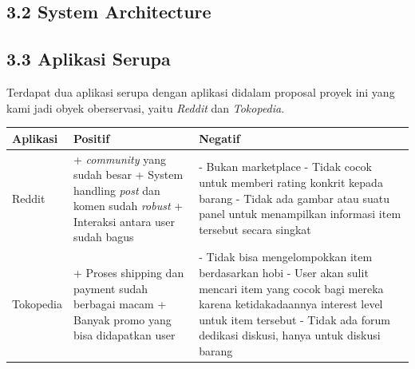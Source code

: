 \documentclass[a4paper]{article}
\begin{document}
\subsection*{3.2 System Architecture}

\newpage
\subsection*{3.3 Aplikasi Serupa}

Terdapat dua aplikasi serupa dengan aplikasi didalam proposal proyek ini yang kami jadi obyek oberservasi, yaitu \textit{Reddit} dan \textit{Tokopedia}.

\begin{table}[h] 
    \begin{tabular}{|m{2cm}|p{5cm}|p{5cm}|}
        \hline
        Aplikasi & Positif & Negatif \\ 
        \hline
        Reddit 
        &   + \textit{community} yang sudah besar \newline 
            + System handling \textit{post} dan komen sudah \textit{robust} \newline 
            + Interaksi antara user sudah bagus 
        &   - Bukan marketplace \newline 
            - Tidak cocok untuk memberi rating konkrit kepada barang \newline 
            - Tidak ada gambar atau suatu panel untuk menampilkan informasi item tersebut secara singkat \\ 
        \hline
        Tokopedia
        &   + Proses shipping dan payment sudah berbagai macam \newline  
            + Banyak promo yang bisa didapatkan user  
        &   - Tidak bisa mengelompokkan item berdasarkan hobi \newline 
            - User akan sulit mencari item yang cocok bagi mereka karena ketidakadaannya interest level untuk item tersebut \newline 
            - Tidak ada forum dedikasi diskusi, hanya untuk diskusi barang \\ 
        \hline
     \end{tabular}
\end{table}
\end{document}
